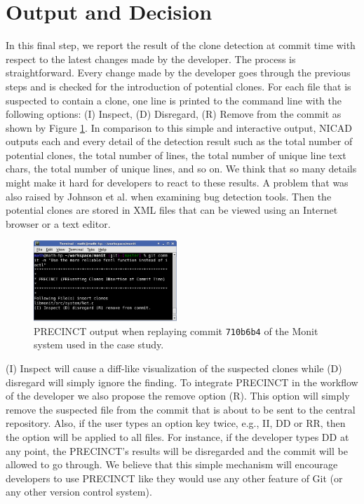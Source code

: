 \section{Output and Decision}
\label{sub:Output and Decision}

In this final step, we report the result of the clone detection at commit time with respect to the latest changes made by the developer. The process is straightforward. Every change made by the developer goes through the previous steps and is checked for the introduction of potential clones. For each file that is suspected to contain a clone, one line is printed to the command line with the following options: (I) Inspect, (D) Disregard, (R) Remove from the commit as shown by Figure \ref{fig:hook}. In comparison to this simple and interactive output, NICAD outputs each and every detail of the detection result such as the total number of potential clones, the total number of lines, the total number of unique line text chars, the total number of unique lines, and so on. We think that so many details might make it hard for developers to react to these results. A problem that was also raised by Johnson et al. \cite{Johnson2013} when examining bug detection tools.
Then the potential clones are stored in XML files that can be viewed using an Internet browser or a text editor.

\begin{figure}
  \centering
    \includegraphics[width=0.48\textwidth]{media/commit.png}
    \caption{PRECINCT output when replaying commit \texttt{710b6b4} of the Monit system used in the case study.\label{fig:hook}}
\end{figure}

(I) Inspect will cause a diff-like visualization of the suspected clones while (D) disregard will simply ignore the finding.
To integrate PRECINCT in the workflow of the developer we also propose the  remove option (R). This option will simply remove the suspected file from the commit that is about to be sent to the central repository.
Also, if the user types an option key twice, e.g., II, DD or RR, then the option will be applied to all files.
For instance, if the developer types DD at any point, the PRECINCT's results will be disregarded and the commit will be allowed to go through. We believe that this simple mechanism will encourage developers to use PRECINCT like they would use any other feature of Git (or any other version control system).


